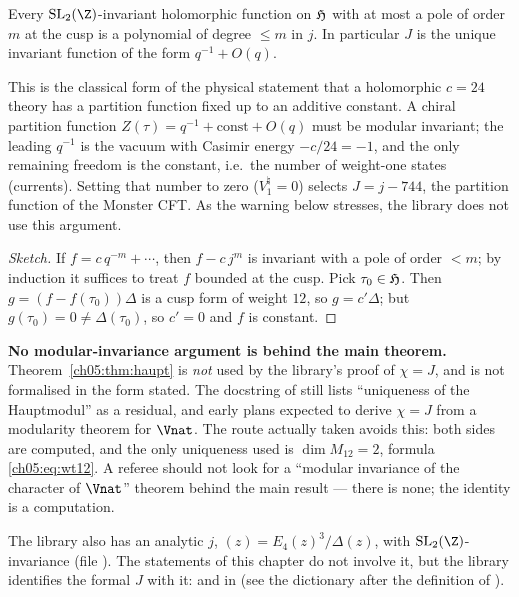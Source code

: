 \begin{theorem}\label{ch05:thm:haupt}
Every $\chfiveSL$-invariant holomorphic function on $\mathfrak{H}$ with at most a pole of order $m$ at the
cusp is a polynomial of degree $\le m$ in $j$. In particular $J$ is the unique invariant function
of the form $q^{-1} + O(q)$.
\end{theorem}

\begin{physics}
This is the classical form of the physical statement that a holomorphic $c=24$ theory has a partition function fixed up to an additive constant. A chiral partition function $Z(\tau)=q^{-1}+\text{const}+O(q)$ must be modular invariant; the leading $q^{-1}$ is the vacuum with Casimir energy $-c/24=-1$, and the only remaining freedom is the constant, i.e.\ the number of weight-one states (currents). Setting that number to zero ($V^\natural_1=0$) selects $J=j-744$, the partition function of the Monster CFT. As the warning below stresses, the library does not use this argument.
\end{physics}
\begin{proof}[Sketch]
If $f = c\,q^{-m} + \cdots$, then $f - c\,j^m$ is invariant with a pole of order $<m$; by induction
it suffices to treat $f$ bounded at the cusp. Pick $\tau_0\in\mathfrak{H}$. Then $g = (f -
f(\tau_0))\Delta$ is a cusp form of weight $12$, so $g = c'\Delta$; but $g(\tau_0) = 0\ne\Delta(\tau_0)$,
so $c' = 0$ and $f$ is constant.
\end{proof}

\begin{warning}
\textbf{No modular-invariance argument is behind the main theorem.}
Theorem~\ref{ch05:thm:haupt} is \emph{not} used by the library's proof of $\chi = J$, and is not
formalised in the form stated. The docstring of  still lists
``uniqueness of the Hauptmodul'' as a residual, and early plans expected to derive $\chi = J$ from
a modularity theorem for $\Vnat$. The route actually taken avoids this: both sides are computed,
and the only uniqueness used is $\dim M_{12} = 2$, formula \eqref{ch05:eq:wt12}. A referee should not
look for a ``modular invariance of the character of $\Vnat$'' theorem behind the main result ---
there is none; the identity is a computation.
\end{warning}

The library also has an analytic $j$,  $(z) = E_4(z)^3/\Delta(z)$, with
$\chfiveSL$-invariance  (file
). The statements of this chapter do not involve it, but the library
identifies the formal $J$ with it:  and  in
 (see the dictionary after the definition of ).


